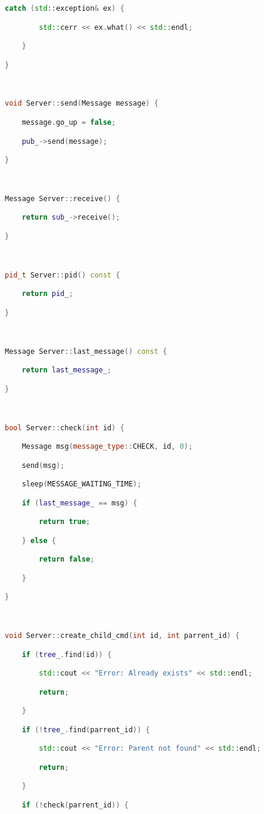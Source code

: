 \begin{lstlisting}[language=C++]
    catch (std::exception& ex) {

        std::cerr << ex.what() << std::endl;

    }

}



void Server::send(Message message) {

    message.go_up = false;

    pub_->send(message);

}



Message Server::receive() {

    return sub_->receive();

}



pid_t Server::pid() const {

    return pid_;

}



Message Server::last_message() const {

    return last_message_;

}



bool Server::check(int id) {

    Message msg(message_type::CHECK, id, 0);

    send(msg);

    sleep(MESSAGE_WAITING_TIME);

    if (last_message_ == msg) {

        return true;

    } else {

        return false;

    }

}



void Server::create_child_cmd(int id, int parrent_id) {

    if (tree_.find(id)) {

        std::cout << "Error: Already exists" << std::endl;

        return;

    }

    if (!tree_.find(parrent_id)) {

        std::cout << "Error: Parent not found" << std::endl;

        return;

    }

    if (!check(parrent_id)) {


\end{lstlisting}
